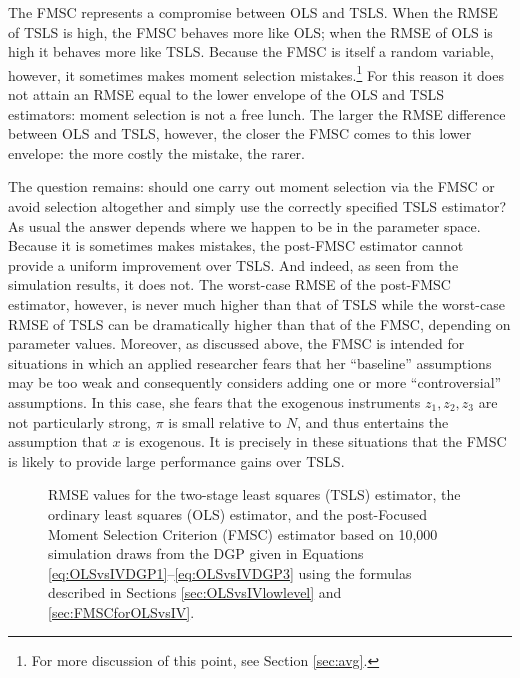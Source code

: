 The FMSC represents a compromise between OLS and TSLS.
When the RMSE of TSLS is high, the FMSC behaves more like OLS; when the RMSE of OLS is high it behaves more like TSLS.
Because the FMSC is itself a random variable, however, it sometimes makes moment selection mistakes.\footnote{For more discussion of this point, see Section \ref{sec:avg}.} 
For this reason it does not attain an RMSE equal to the lower envelope of the OLS and TSLS estimators: moment selection is not a free lunch.
The larger the RMSE difference between OLS and TSLS, however, the closer the FMSC comes to this lower envelope: the more costly the mistake, the rarer.

The question remains: should one carry out moment selection via the FMSC or avoid selection altogether and simply use the correctly specified TSLS estimator?
As usual the answer depends where we happen to be in the parameter space.
Because it is sometimes makes mistakes, the post-FMSC estimator cannot provide a uniform improvement over TSLS.
And indeed, as seen from the simulation results, it does not.
The worst-case RMSE of the post-FMSC estimator, however, is never much higher than that of TSLS while the worst-case RMSE of TSLS can be dramatically higher than that of the FMSC, depending on parameter values.
Moreover, as discussed above, the FMSC is intended for situations in which an applied researcher fears that her ``baseline'' assumptions may be too weak and consequently considers adding one or more ``controversial'' assumptions. 
In this case, she fears that the exogenous instruments $z_1, z_2, z_3$ are not particularly strong, $\pi$ is small relative to $N$, and thus entertains the assumption that $x$ is exogenous.
It is precisely in these situations that the FMSC is likely to provide large performance gains over TSLS.

\begin{figure}
\centering
	
	\caption{RMSE values for the two-stage least squares (TSLS) estimator, the ordinary least squares (OLS) estimator, and the post-Focused Moment Selection Criterion (FMSC) estimator based on 10,000 simulation draws from the DGP given in Equations \ref{eq:OLSvsIVDGP1}--\ref{eq:OLSvsIVDGP3} using the formulas described in Sections \ref{sec:OLSvsIVlowlevel} and \ref{sec:FMSCforOLSvsIV}.}
	\label{fig:OLSvsIV_RMSEbaseline}
\end{figure}

